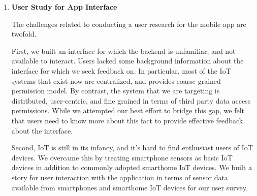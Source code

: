\begin{enumerate}
\item \textbf{User Study for App Interface}

The challenges related to conducting a user research for the mobile app are twofold.

First, we built an interface for which the backend is unfamiliar, and not available to interact. Users lacked some background information about the interface for which we seek feedback on. In particular, most of the IoT systems that exist now are centralized, and provides coarse-grained permission model. By contrast, the system that we are targeting is distributed, user-centric, and fine grained in terms of third party data access permissions. While we attempted our best effort to bridge this gap, we felt that users need to know more about this fact to provide effective feedback about the interface.

Second, IoT is still in its infancy, and it's hard to find enthusiast users of IoT devices. We overcame this by treating smartphone sensors as basic IoT devices in addition to commonly adopted smarthome IoT devices. We built a story for user interaction with the application in terms of sensor data available from smartphones and smarthome IoT devices for our user survey.
\end{enumerate}